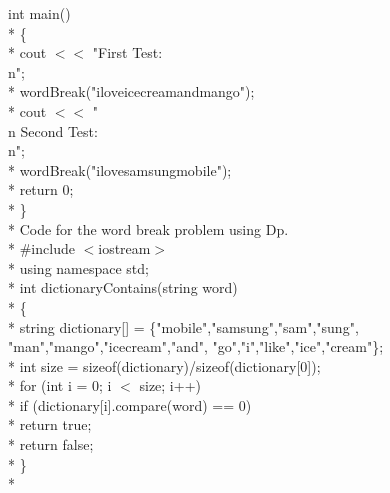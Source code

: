 \documentclass[12pt]{book}
\begin{document}
int main()\\*
\{\\*
\phantom{x} \hspace{3ex}    cout $<<$ "First Test:\\n";\\*
\phantom{x} \hspace{3ex}    wordBreak("iloveicecreamandmango");\\*
\phantom{x} \hspace{3ex}    cout $<<$ "\\n Second Test:\\n";\\*
\phantom{x} \hspace{3ex}    wordBreak("ilovesamsungmobile");\\*
\phantom{x} \hspace{3ex}    return 0;\\*
\}\\*
\newline
\newline
Code for the word break problem using Dp.\\*
$\#$include $<$iostream$>$ \\*
using namespace std; \\*
int dictionaryContains(string word) \\*
\{ \\*
\phantom{x} \hspace{3ex}    string dictionary[] = \{"mobile","samsung","sam","sung", 
                            "man","mango","icecream","and", 
                            "go","i","like","ice","cream"\}; \\*
\phantom{x} \hspace{3ex}    int size = sizeof(dictionary)/sizeof(dictionary[0]); \\*
\phantom{x} \hspace{3ex}    for (int i = 0; i $<$ size; i++) \\*
\phantom{x} \hspace{3ex} \phantom{x} \hspace{3ex}       if (dictionary[i].compare(word) == 0) \\*
\phantom{x} \hspace{3ex} \phantom{x} \hspace{3ex} \phantom{x} \hspace{3ex}      return true; \\*
\phantom{x} \hspace{3ex}    return false; \\*
\} \\*
\end{document}
